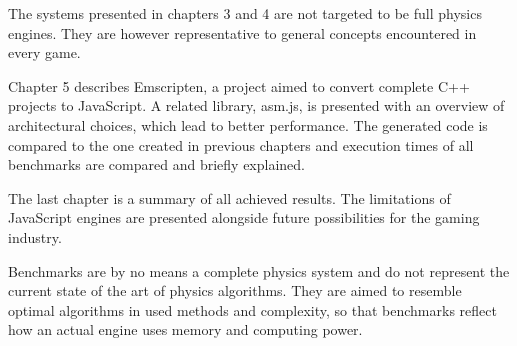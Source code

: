 The systems presented in chapters 3 and 4 are not targeted to be full physics engines. They are however representative to general concepts encountered in every game.

Chapter 5 describes Emscripten, a project aimed to convert complete C++ projects to JavaScript. A related library, asm.js, is presented with an overview of architectural choices, which lead to better performance. The generated code is compared to the one created in previous chapters and execution times of all benchmarks are compared and briefly explained.

The last chapter is a summary of all achieved results. The limitations of JavaScript engines are presented alongside future possibilities for the gaming industry.

Benchmarks are by no means a complete physics system and do not represent the current state of the art of physics algorithms. They are aimed to resemble optimal algorithms in used methods and complexity, so that benchmarks reflect how an actual engine uses memory and computing power.

